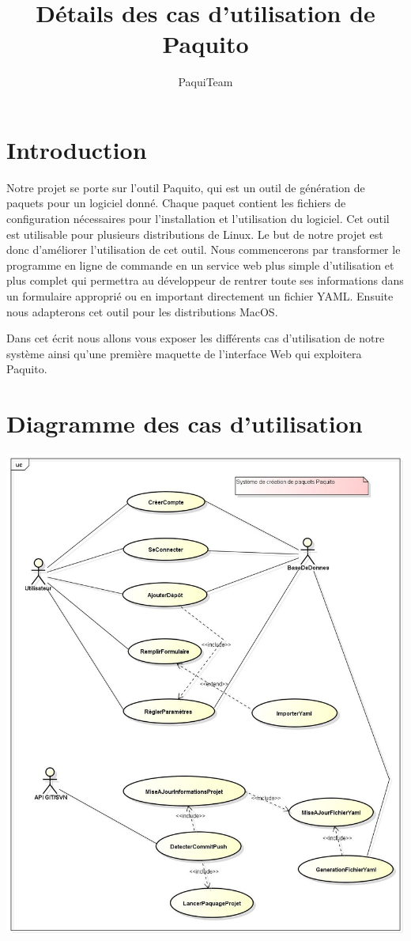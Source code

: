 \documentclass[12pt,a4paper]{article}
\title{Détails des cas d'utilisation de Paquito}
\author{PaquiTeam}
\begin{document}


\section*{Introduction}
Notre projet se porte sur l'outil Paquito, qui est un outil de génération de paquets pour un logiciel donné. Chaque paquet contient les fichiers de configuration nécessaires pour l'installation et l'utilisation du logiciel. Cet outil est utilisable pour plusieurs distributions de Linux. Le but de notre projet est donc d'améliorer l'utilisation de cet outil. Nous commencerons par transformer le programme en ligne de commande en un service web plus simple d'utilisation et plus complet qui permettra au développeur de rentrer toute ses informations dans un formulaire approprié ou en important directement un fichier YAML. Ensuite nous adapterons cet outil pour les distributions MacOS. 
	
Dans cet écrit nous allons vous exposer les différents cas d'utilisation de notre système ainsi qu'une première maquette de l'interface Web qui exploitera Paquito.

\section{Diagramme des cas d'utilisation}

\includegraphics[scale=0.39]{../img/Diagram1_haut.jpg}
\end{document}
